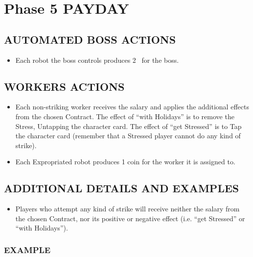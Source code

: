 \section{Phase 5 PAYDAY}

    \subsection{AUTOMATED BOSS ACTIONS}

        \begin{itemize}
            \item Each robot the boss controls produces 2 \faRubleSign\ for the boss.
        \end{itemize}
    
    \subsection{WORKERS ACTIONS}

        \begin{itemize}
            \item Each non-striking worker receives the salary and applies the additional
            effects from the chosen Contract. The effect of “with Holidays” is to remove
            the Stress, Untapping the character card. The effect of “get Stressed” is to
            Tap the character card (remember that a Stressed player cannot do any kind
            of strike).
            \item Each Expropriated robot produces 1 coin for the worker it is assigned to.
        \end{itemize}

    \subsection{ADDITIONAL DETAILS AND EXAMPLES}

        \begin{itemize}
            \item Players who attempt any kind of strike will receive neither the salary from
            the chosen Contract, nor its positive or negative effect (i.e. “get Stressed” or
            “with Holidays”).
        \end{itemize}
    
        \subsubsection{EXAMPLE}

